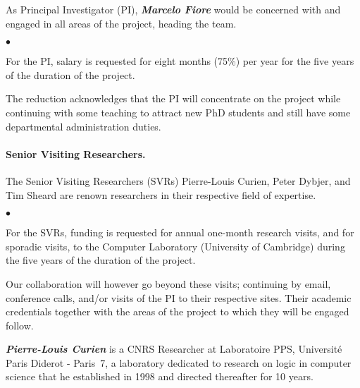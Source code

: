 \documentclass[11pt,twocolumn]{article}
\newenvironment{myitemize}
  {\begin{list}{$\bullet$}
  {\setlength{\topsep}{2pt}
   \setlength{\partopsep}{2pt}
   \setlength{\itemsep}{2.5pt}
   \setlength{\parsep}{2.5pt}
   \setlength{\leftmargin}{1em}
   \setlength{\labelwidth}{.5em}}}
  {\end{list}}
\newcommand{\erc}{{\small\sf MaStrPLan}}
\newcommand{\SysL}{$L$}%
\begin{document}
As Principal Investigator (PI), \textbf{\em Marcelo Fiore} would be concerned
with and engaged in all areas of the project, heading the %
team. 
\begin{myitemize}
\item
For the PI, salary is requested for eight months (75\%) per year for the five
years of the duration of the project.  
\end{myitemize}
The reduction acknowledges that the PI will concentrate on the project while
continuing with some teaching to attract new PhD students and still have some
departmental administration duties.

\paragraph*{Senior Visiting Researchers.}

The Senior Visiting Researchers (SVRs) Pierre-Louis Curien, Peter Dybjer, and
Tim Sheard are renown researchers in their respective field of expertise.  
\begin{myitemize}
\item
For the SVRs, funding is requested for annual one-month research visits, and
for sporadic visits, to the Computer Laboratory (University of Cambridge)
during the five years of the duration of the project.  
\end{myitemize}
Our collaboration will however go beyond these visits; continuing by email,
conference calls, and/or visits of the PI to their respective sites.
%
Their academic credentials together with the areas of the project
to which they will be engaged follow.

\smallskip\noindent
\textbf{\em Pierre-Louis Curien} 
%
%
is a CNRS Researcher at Laboratoire PPS, Universit\'e Paris Diderot -
Paris~7, a laboratory dedicated to research on logic in computer science
that he established in 1998 and directed thereafter for 10 years.  
%
\end{document}
